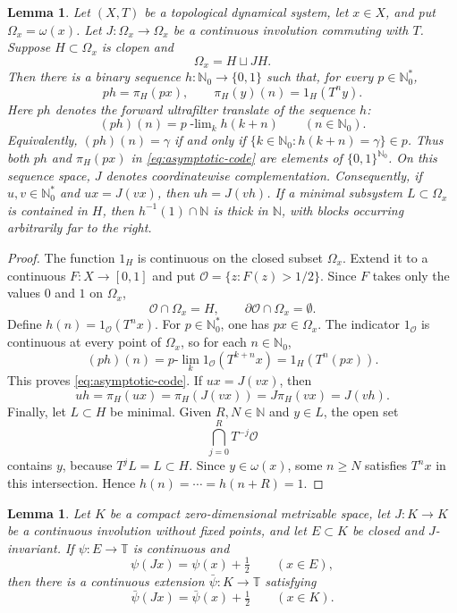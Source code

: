 \documentclass[reqno,12pt]{amsart}
\newtheorem{lemma}[thm]{Lemma}
\newcommand{\Nzero}{\mathbb N_0}
\newcommand{\Nstar}{\Nzero^{*}}
\newcommand{\Torus}{\mathbb T}
\def \N {\mathbb N}
\numberwithin{equation}{section}
\begin{document}
\begin{lemma}\label{lem:asymptotic-binary-coding}
Let $(X,T)$ be a topological dynamical system, let $x\in X$, and put
$\Omega_x=\omega(x)$. Let $J:\Omega_x\to\Omega_x$ be a continuous
involution commuting with $T$. Suppose $H\subset\Omega_x$ is clopen and
\[
 \Omega_x=H\sqcup JH.
\]
Then there is a binary sequence $h:\Nzero\to\{0,1\}$ such that, for every
$p\in\Nstar$,
\begin{equation}\label{eq:asymptotic-code}
 ph=\pi_H(px),
 \qquad
 \pi_H(y)(n)=1_H(T^ny).
\end{equation}
Here $ph$ denotes the forward ultrafilter translate of the sequence $h$:
\[
 (ph)(n)=p\!\operatorname{-lim}_{k}h(k+n)
 \qquad(n\in\Nzero).
\]
Equivalently, $(ph)(n)=\gamma$ if and only if
$\{k\in\Nzero:h(k+n)=\gamma\}\in p$.
Thus both $ph$ and $\pi_H(px)$ in \eqref{eq:asymptotic-code} are elements
of $\{0,1\}^{\Nzero}$. On this sequence space, $J$ denotes coordinatewise
complementation.
Consequently, if $u,v\in\Nstar$ and $ux=J(vx)$, then
$uh=J(vh)$. If a minimal subsystem $L\subset\Omega_x$ is contained in
$H$, then $h^{-1}(1)\cap\N$ is thick in $\N$, with blocks occurring
arbitrarily far to the right.
\end{lemma}

\begin{proof}
The function $1_H$ is continuous on the closed subset $\Omega_x$. Extend it
to a continuous $F:X\to[0,1]$ and put
$\mathcal O=\{z:F(z)>1/2\}$. Since $F$ takes only the values $0$ and $1$ on
$\Omega_x$,
\[
 \mathcal O\cap\Omega_x=H,
 \qquad
 \partial\mathcal O\cap\Omega_x=\emptyset.
\]
Define $h(n)=1_{\mathcal O}(T^nx)$. For $p\in\Nstar$, one has
$px\in\Omega_x$. The indicator $1_{\mathcal O}$ is continuous at every point
of $\Omega_x$, so for each $n\in\Nzero$,
\[
 (ph)(n)
 =p\text{-}\lim_k1_{\mathcal O}(T^{k+n}x)
 =1_H(T^n(px)).
\]
This proves \eqref{eq:asymptotic-code}. If $ux=J(vx)$, then
\[
 uh=\pi_H(ux)=\pi_H(J(vx))=J\pi_H(vx)=J(vh).
\]
Finally, let $L\subset H$ be minimal. Given $R,N\in\N$ and $y\in L$, the
open set
\[
 \bigcap_{j=0}^{R}T^{-j}\mathcal O
\]
contains $y$, because $T^jL=L\subset H$. Since $y\in\omega(x)$, some
$n\ge N$ satisfies $T^nx$ in this intersection. Hence
$h(n)=\cdots=h(n+R)=1$.
\end{proof}

\begin{lemma}%
\label{lem:equivariant-circle-extension}
Let $K$ be a compact zero-dimensional metrizable space, let $J:K\to K$ be a continuous involution without fixed points, and let
$E\subset K$ be closed and $J$-invariant. If $\psi:E\to\Torus$ is continuous
and
\[
 \psi(Jx)=\psi(x)+\tfrac12\qquad(x\in E),
\]
then there is a continuous extension $\bar\psi:K\to\Torus$ satisfying
\[
 \bar\psi(Jx)=\bar\psi(x)+\tfrac12\qquad(x\in K).
\]
\end{lemma}
\end{document}
